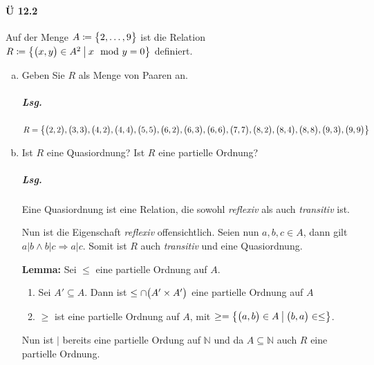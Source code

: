 \documentclass{scrreprt}
\begin{document}
\paragraph{Ü 12.2} Auf der Menge $A \coloneqq \qty\big{2, \ldots, 9}$ ist die
Relation $R \coloneqq \qty{
  \qty\big(x, y) \in A^2
  \:\middle|\: x \mod y = 0
}$ definiert.
\begin{enumerate}[(a)]
\item Geben Sie $R$ als Menge von Paaren an.

  \subparagraph{Lsg.}
  \[
    R = \qty{
      \qty\big(2, 2),
      \qty\big(3, 3),
      \qty\big(4, 2),
      \qty\big(4, 4),
      \qty\big(5, 5),
      \qty\big(6, 2),
      \qty\big(6, 3),
      \qty\big(6, 6),
      \qty\big(7, 7),
      \qty\big(8, 2),
      \qty\big(8, 4),
      \qty\big(8, 8),
      \qty\big(9, 3),
      \qty\big(9, 9)
    }
  \]

\item Ist $R$ eine Quasiordnung?
  Ist $R$ eine partielle Ordnung?

  \subparagraph{Lsg.} Eine Quasiordnung ist eine Relation, die sowohl
  \emph{reflexiv} als auch \emph{transitiv} ist.

  Nun ist die Eigenschaft \emph{reflexiv} offensichtlich.
  Seien nun $a, b, c \in A$, dann gilt
  $a|b \land b|c \Rightarrow a|c$.
  Somit ist $R$ auch \emph{transitiv} und eine Quasiordnung.

  \textbf{Lemma:} Sei $\leq$ eine partielle Ordnung auf $A$.
  \begin{enumerate}[(1)]
  \item Sei $A' \subseteq A$.
    Dann ist $\leq \cap \qty\big(A' \times A')$ eine partielle Ordnung auf $A$
  \item $\geq$ ist eine partielle Ordnung auf $A$, mit
    $\geq = \qty{
      \qty\big(a, b) \in A
      \:\middle|\:
      \qty\big(b, a) \in \leq
    }$.
  \end{enumerate}
  Nun ist $|$ bereits eine partielle Ordung auf $\mathbb{N}$ und da
  $A \subseteq \mathbb{N}$ auch $R$ eine partielle Ordnung.
\end{enumerate}

\newpage
\end{document}
